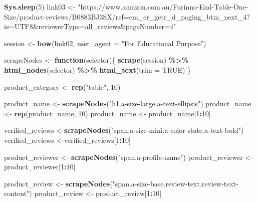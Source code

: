 \documentclass[
]{article}
\newenvironment{Shaded}{\begin{snugshade}}{\end{snugshade}}
\newcommand{\AttributeTok}[1]{\textcolor[rgb]{0.13,0.29,0.53}{#1}}
\newcommand{\ConstantTok}[1]{\textcolor[rgb]{0.56,0.35,0.01}{#1}}
\newcommand{\ControlFlowTok}[1]{\textcolor[rgb]{0.13,0.29,0.53}{\textbf{#1}}}
\newcommand{\DecValTok}[1]{\textcolor[rgb]{0.00,0.00,0.81}{#1}}
\newcommand{\FunctionTok}[1]{\textcolor[rgb]{0.13,0.29,0.53}{\textbf{#1}}}
\newcommand{\NormalTok}[1]{#1}
\newcommand{\OtherTok}[1]{\textcolor[rgb]{0.56,0.35,0.01}{#1}}
\newcommand{\SpecialCharTok}[1]{\textcolor[rgb]{0.81,0.36,0.00}{\textbf{#1}}}
\newcommand{\StringTok}[1]{\textcolor[rgb]{0.31,0.60,0.02}{#1}}
\begin{document}
\begin{Shaded}
\begin{Highlighting}[]
   \FunctionTok{Sys.sleep}\NormalTok{(}\DecValTok{5}\NormalTok{)}
\NormalTok{link03 }\OtherTok{\textless{}{-}} \StringTok{"https://www.amazon.com.au/Furinno{-}End{-}Table{-}One{-}Size/product{-}reviews/B0883BJ3SX/ref=cm\_cr\_getr\_d\_paging\_btm\_next\_4?ie=UTF8\&reviewerType=all\_reviews\&pageNumber=4"}


\NormalTok{  session }\OtherTok{\textless{}{-}} \FunctionTok{bow}\NormalTok{(link02,}
               \AttributeTok{user\_agent =} \StringTok{"For Educational Purpose"}\NormalTok{)}

\NormalTok{  scrapeNodes }\OtherTok{\textless{}{-}} \ControlFlowTok{function}\NormalTok{(selector)\{}
    \FunctionTok{scrape}\NormalTok{(session) }\SpecialCharTok{\%\textgreater{}\%}
      \FunctionTok{html\_nodes}\NormalTok{(selector) }\SpecialCharTok{\%\textgreater{}\%}
      \FunctionTok{html\_text}\NormalTok{(}\AttributeTok{trim =} \ConstantTok{TRUE}\NormalTok{)}
\NormalTok{  \}}

\NormalTok{  product\_category }\OtherTok{\textless{}{-}} \FunctionTok{rep}\NormalTok{(}\StringTok{"table"}\NormalTok{, }\DecValTok{10}\NormalTok{)}

\NormalTok{  product\_name }\OtherTok{\textless{}{-}} \FunctionTok{scrapeNodes}\NormalTok{(}\StringTok{"h1.a{-}size{-}large.a{-}text{-}ellipsis"}\NormalTok{)}
\NormalTok{  product\_name }\OtherTok{\textless{}{-}} \FunctionTok{rep}\NormalTok{(product\_name, }\DecValTok{10}\NormalTok{)}
\NormalTok{  product\_name }\OtherTok{\textless{}{-}}\NormalTok{ product\_name[}\DecValTok{1}\SpecialCharTok{:}\DecValTok{10}\NormalTok{]}
  
\NormalTok{  verified\_reviews }\OtherTok{\textless{}{-}}\FunctionTok{scrapeNodes}\NormalTok{(}\StringTok{"span.a{-}size{-}mini.a{-}color{-}state.a{-}text{-}bold"}\NormalTok{)}
\NormalTok{  verified\_reviews }\OtherTok{\textless{}{-}}\NormalTok{verified\_reviews[}\DecValTok{1}\SpecialCharTok{:}\DecValTok{10}\NormalTok{]}
  
\NormalTok{  product\_reviewer }\OtherTok{\textless{}{-}} \FunctionTok{scrapeNodes}\NormalTok{(}\StringTok{"span.a{-}profile{-}name"}\NormalTok{)}
\NormalTok{  product\_reviewer }\OtherTok{\textless{}{-}}\NormalTok{ product\_reviewer[}\DecValTok{1}\SpecialCharTok{:}\DecValTok{10}\NormalTok{]}
  
\NormalTok{  product\_review }\OtherTok{\textless{}{-}} \FunctionTok{scrapeNodes}\NormalTok{(}\StringTok{"span.a{-}size{-}base.review{-}text.review{-}text{-}content"}\NormalTok{)}
\NormalTok{  product\_review }\OtherTok{\textless{}{-}}\NormalTok{ product\_review[}\DecValTok{1}\SpecialCharTok{:}\DecValTok{10}\NormalTok{]}
  

\end{Highlighting}
\end{Shaded}
\end{document}
